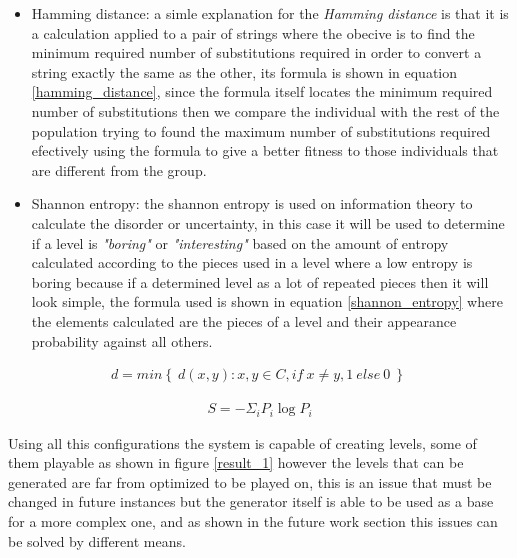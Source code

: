\documentclass[conference]{IEEEtran}
\begin{document}
\begin{itemize}
    \item Hamming distance: a simle explanation for the \textit{Hamming distance} is that it is a calculation applied to a pair of strings where the obecive is to find the minimum required number of substitutions required in order to convert a string exactly the same as the other, its formula is shown in equation \ref{hamming_distance}, since the formula itself locates the minimum required number of substitutions then we compare the individual with the rest of the population trying to found the maximum number of substitutions required efectively using the formula to give a better fitness to those individuals that are different from the group.
    \item Shannon entropy: the shannon entropy is used on information theory to calculate the disorder or uncertainty, in this case it will be used to determine if a level is \textit{"boring"} or \textit{"interesting"} based on the amount of entropy calculated according to the pieces used in a level where a low entropy is boring because if a determined level as a lot of repeated pieces then it will look simple, the formula used is shown in equation \ref{shannon_entropy} where the elements calculated are the pieces of a level and their appearance probability against all others.
\end{itemize}

\begin{equation}
    \begin{aligned}
    d = min \left\{ \ d(x,y): x,y \in C, if \: x \neq y, 1 \: else \: 0 \: \right\} \
    \end{aligned}
    \label{hamming_distance}
\end{equation}

\begin{equation}
    \begin{aligned}
    S = - \Sigma_i P_i \log P_i
    \end{aligned}
    \label{shannon_entropy}
\end{equation}

Using all this configurations the system is capable of creating levels, some of them playable as shown in figure \ref{result_1} however the levels that can be generated are far from optimized to be played on, this is an issue that must be changed in future instances but the generator itself is able to be used as a base for a more complex one, and as shown in the future work section this issues can be solved by different means.
\end{document}
